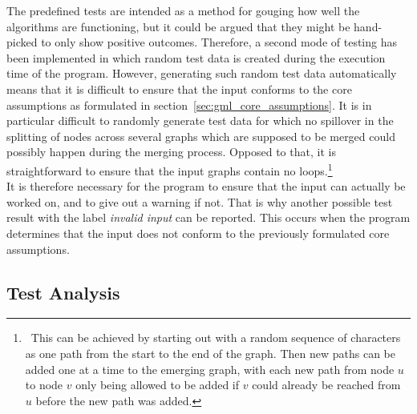 \documentclass[a4paper,12pt,twoside,BCOR=10mm]{scrbook}
\begin{document}
The predefined tests are intended as a method for gouging how well the algorithms 
are functioning, but it could be argued that they might be hand-picked 
to only show positive outcomes. 
Therefore, a second mode of testing has been implemented 
in which random test data is created during the execution time of the program. 
However, generating such random test data automatically means 
that it is difficult to ensure that the input conforms 
to the core assumptions as formulated in section~\ref{sec:gml_core_assumptions}. 
It is in particular difficult to randomly generate test data for which 
no spillover in the splitting of nodes across several graphs which are 
supposed to be merged could possibly happen during the merging process. 
Opposed to that, it is straightforward to ensure that the input graphs 
contain no loops.\footnote{\,\,\,This can be achieved by starting out with a 
random sequence of characters as one path from the start to the end 
of the graph. 
Then new paths can be added one at a time to the emerging 
graph, with each new path from node $ u $ to node $ v $ only being 
allowed to be added if $ v $ could already be reached from $ u $ before 
the new path was added.} \\
It is therefore necessary for the program to ensure that the 
input can actually be worked on, and to give out a warning if not. 
That is why another possible test result with the label \textit{invalid input} can be reported. 
This occurs when the program determines that the input does not conform 
to the previously formulated core assumptions. 

\subsection{Test Analysis}
\end{document}
